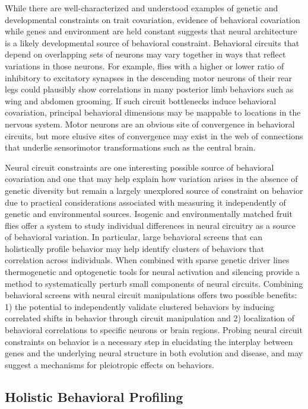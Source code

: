 \documentclass[12pt,letterpaper]{article}
\begin{document}
While there are well-characterized and understood examples of genetic and developmental constraints on trait covariation, evidence of behavioral covariation while genes and environment are held constant suggests that neural architecture is a likely developmental source of behavioral constraint. Behavioral circuits that depend on overlapping sets of neurons may vary together in ways that reflect variations in those neurons. For example, flies with a higher or lower ratio of inhibitory to excitatory synapses in the descending motor neurons of their rear legs could plausibly show correlations in many posterior limb behaviors such as wing and abdomen grooming. If such circuit bottlenecks induce behavioral covariation, principal behavioral dimensions may be mappable to locations in the nervous system. Motor neurons are an obvious site of convergence in behavioral circuits, but more elusive sites of convergence may exist in the web of connections that underlie sensorimotor transformations such as the central brain.

Neural circuit constraints are one interesting possible source of behavioral covariation and one that may help explain how variation arises in the absence of genetic diversity but remain a largely unexplored source of constraint on behavior due to practical considerations associated with measuring it independently of genetic and environmental sources. Isogenic and environmentally matched fruit flies offer a system to study individual differences in neural circuitry as a source of behavioral variation. In particular, large behavioral screens that can holistically profile behavior may help identify clusters of behaviors that correlation across individuals. When combined with sparse genetic driver lines thermogenetic and optogenetic tools for neural activation and silencing provide a method to systematically perturb small components of neural circuits. Combining behavioral screens with neural circuit manipulations offers two possible benefits: 1) the potential to independently validate clustered behaviors by inducing correlated shifts in behavior through circuit manipulation and 2) localization of behavioral correlations to specific neurons or brain regions. Probing neural circuit constraints on behavior is a necessary step in elucidating the interplay between genes and the underlying neural structure in both evolution and disease, and may suggest a mechanisms for pleiotropic effects on behaviors.

\subsection{Holistic Behavioral Profiling}
\end{document}
